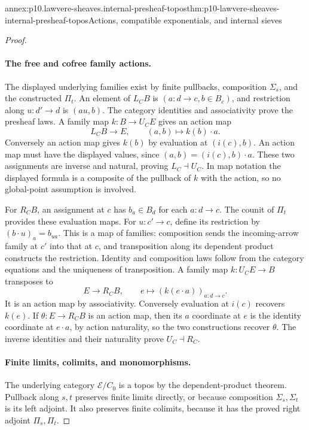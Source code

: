 \begin{annexitem}{annex:p10.lawvere-sheaves.internal-presheaf-topos}{thm:p10-lawvere-sheaves-internal-presheaf-topos}{Actions, compatible exponentials, and internal sieves}
\begin{proof}
\paragraph{The free and cofree family actions.}
The displayed underlying families exist by finite pullbacks,
composition \(\Sigma_s\), and the constructed \(\Pi_t\).
An element of \(L_CB\) is \((a:d\to c,b\in B_c)\),
and restriction along \(u:d'\to d\) is \((a u,b)\).
The category identities and associativity prove the presheaf laws.
A family map \(k:B\to U_CE\) gives an action map
\[
              L_CB\to E,\qquad(a,b)\mapsto k(b)\cdot a.
\]
Conversely an action map gives \(k(b)\) by evaluation at
\((i(c),b)\).  An action map must have the displayed values,
since \((a,b)=(i(c),b)\cdot a\).  These two assignments
are inverse and natural, proving \(L_C\dashv U_C\).
In map notation the displayed formula is a composite of the
pullback of \(k\) with the action, so no global-point
assumption is involved.

For \(R_CB\), an assignment at \(c\) has \(b_a\in B_d\)
for each \(a:d\to c\).  The counit of \(\Pi_t\) provides
these evaluation maps.  For \(u:c'\to c\), define its
restriction by \((b\cdot u)_a=b_{u a}\).  This is a map
of families: composition sends the incoming-arrow family at
\(c'\) into that at \(c\), and transposition along its
dependent product constructs the restriction.  Identity and
composition laws follow from the category equations and the
uniqueness of transposition.  A family map \(k:U_CE\to B\)
transposes to
\[
 E\to R_CB,\qquad e\mapsto(k(e\cdot a))_{a:d\to c}.
\]
It is an action map by associativity.  Conversely evaluation
at \(i(c)\) recovers \(k(e)\).  If \(\theta:E\to R_CB\)
is an action map, then its \(a\) coordinate at \(e\) is
the identity coordinate at \(e\cdot a\), by action
naturality, so the two constructions recover \(\theta\).
The inverse identities and their naturality prove
\(U_C\dashv R_C\).

\paragraph{Finite limits, colimits, and monomorphisms.}
The underlying category \(\mathcal E/C_0\) is a topos
by the dependent-product theorem.  Pullback along \(s,t\)
preserves finite limits directly, or because composition
\(\Sigma_s,\Sigma_t\) is its left adjoint.  It also
preserves finite colimits, because it has the proved right
adjoint \(\Pi_s,\Pi_t\).


\end{proof}
\end{annexitem}
